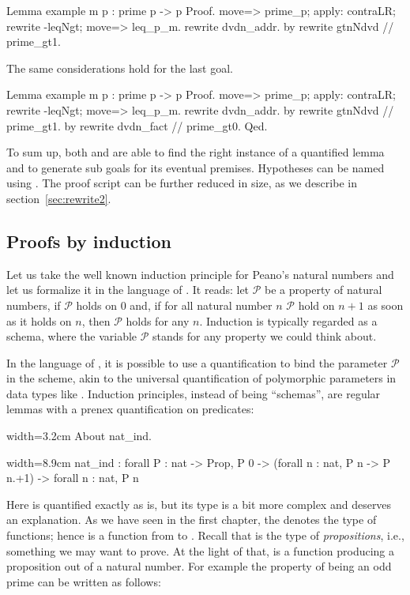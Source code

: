 \begin{coq}{}{}
Lemma example m p : prime p -> p %
Proof.
move=> prime_p; apply: contraLR; rewrite -leqNgt; move=> leq_p_m.
rewrite dvdn_addr.
  by rewrite gtnNdvd // prime_gt1.
\end{coq}
The same considerations hold for the last goal.

\begin{coq}{}{}
Lemma example m p : prime p -> p %
Proof.
move=> prime_p; apply: contraLR; rewrite -leqNgt; move=> leq_p_m.
rewrite dvdn_addr.
  by rewrite gtnNdvd // prime_gt1.
by rewrite dvdn_fact // prime_gt0.
Qed.
\end{coq}

To sum up, both  and  are able to find the right
instance of a quantified lemma and to generate sub goals
for its eventual premises.  Hypotheses can be named using .
The proof script can be further reduced in size, as we describe in
section~\ref{sec:rewrite2}.

\subsection{Proofs by induction}\label{ssec:ind}

Let us take the well known induction principle for Peano's natural numbers
and let us formalize it in the language of \Coq{}.  It reads:
let $\mathcal{P}$ be a property of natural numbers, if
$\mathcal{P}$ holds on $0$ and, if for all natural number $n$
$\mathcal{P}$ hold on $n + 1$ as soon as it holds on $n$, then $\mathcal{P}$
holds for any $n$.  Induction is typically regarded as a schema, where
the variable $\mathcal{P}$ stands for any property we could think about.

In the language of \Coq{}, it is possible to use a quantification to
bind the parameter  $\mathcal{P}$ in the scheme, akin to the universal
quantification of polymorphic parameters in data types like
. Induction principles, instead of being ``schemas'', are
regular lemmas with a prenex quantification on predicates:

\begin{coq}{}{width=3.2cm}
About nat_ind.
\end{coq}
\begin{coqout}{}{width=8.9cm}
nat_ind : forall P : nat -> Prop,
  P 0 -> (forall n : nat, P n -> P n.+1) -> forall n : nat, P n
\end{coqout}
Here  is quantified exactly as  is, but its type is a bit more
complex and deserves an explanation.  As we have seen in the first
chapter, the \C{->} denotes the type of functions; hence  is a
function from  to .  Recall that  is the type
of \emph{propositions}, i.e., something we may want to prove.  At the
light of that,  is a function producing a proposition out of a natural
number.  For example the property of being an odd prime can be written as
follows:

